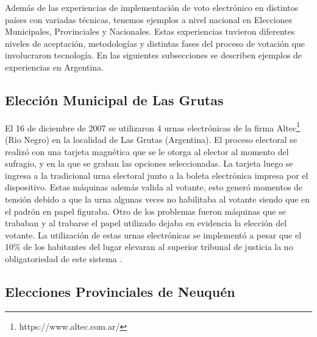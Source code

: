 Además de las experiencias de implementación de voto electrónico en distintos países con variadas técnicas, tenemos ejemplos a nivel nacional en Elecciones Municipales, Provinciales y Nacionales. Estas experiencias tuvieron diferentes niveles de aceptación, metodologías y distintas fases del proceso de votación que involucraron tecnología. En las siguientes subsecciones se describen ejemplos de experiencias en Argentina.

\subsection{Elección Municipal de Las Grutas}
El 16 de diciembre de 2007 se utilizaron 4 urnas electrónicas de la firma Altec\footnote{https://www.altec.com.ar/} (Rio Negro) en la localidad de Las Grutas (Argentina). El proceso electoral se realizó con una tarjeta magnética que se le otorga al elector al momento del sufragio, y en la que se graban las opciones seleccionadas. La tarjeta luego se ingresa a la tradicional urna electoral junto a la boleta electrónica impresa por el dispositivo. Estas máquinas además valida al votante, esto generó momentos de tensión debido a que la urna algunas veces no habilitaba al votante siendo que en el padrón en papel figuraba. Otro de los problemas fueron máquinas que se trababan y al trabarse el papel utilizado dejaba en evidencia la elección del votante. La utilización de estas urnas electrónicas se implementó a pesar que el 10\% de los habitantes del lugar elevaran al superior tribunal de justicia la no obligatoriedad de este sistema \cite{eleccionesLasGrutas}.
\subsection{Elecciones Provinciales de Neuquén}

